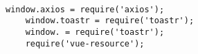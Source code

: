 \ \\
\begin{lstlisting}[label=webpack,style=htmlcssjs,caption=\textit{Script} Webpack yang Belum Dioptimasi]
	window.axios = require('axios');
	window.toastr = require('toastr');
	window. = require('toastr');
	require('vue-resource');
\end{lstlisting}